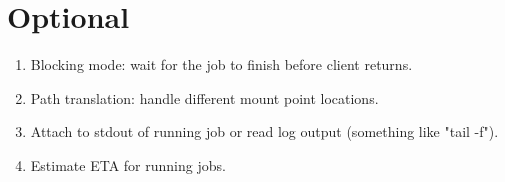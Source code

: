 \documentclass[a4paper,10pt]{article}
\begin{document}
\section{Optional}
\begin{enumerate}
 \item Blocking mode: wait for the job to finish before client returns.
 \item Path translation: handle different mount point locations.
 \item Attach to stdout of running job or read log output (something like "tail -f").
 \item Estimate ETA for running jobs.
\end{enumerate}
\end{document}

